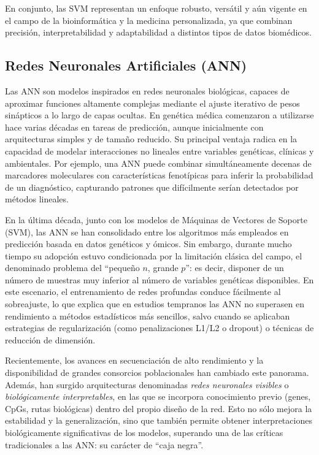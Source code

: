 \documentclass[11pt,a4paper,spanish]{book}
\numberwithin{equation}{chapter}
\numberwithin{figure}{chapter}
\begin{document}
En conjunto, las SVM representan un enfoque robusto, versátil y aún vigente en el campo de la bioinformática y la medicina personalizada, ya que combinan precisión, interpretabilidad y adaptabilidad a distintos tipos de datos biomédicos.
\cite{info15040235}

\subsection{Redes Neuronales Artificiales (ANN)}

Las ANN son modelos inspirados en redes neuronales biológicas, capaces de aproximar funciones altamente complejas mediante el ajuste iterativo de pesos sinápticos a lo largo de capas ocultas. En genética médica comenzaron a utilizarse hace varias décadas en tareas de predicción, aunque inicialmente con arquitecturas simples y de tamaño reducido\cite{lisboa2002,Libbrecht2015}. Su principal ventaja radica en la capacidad de modelar interacciones no lineales entre variables genéticas, clínicas y ambientales. Por ejemplo, una ANN puede combinar simultáneamente decenas de marcadores moleculares con características fenotípicas para inferir la probabilidad de un diagnóstico, capturando patrones que difícilmente serían detectados por métodos lineales.\cite{deep_angemuller_2016,rajkomar_2019}

En la última década, junto con los modelos de Máquinas de Vectores de Soporte (SVM), las ANN se han consolidado entre los algoritmos más empleados en predicción basada en datos genéticos y ómicos\cite{Libbrecht2015,deep_angemuller_2016}. Sin embargo, durante mucho tiempo su adopción estuvo condicionada por la limitación clásica del campo, el denominado problema del “pequeño $n$, grande $p$”: es decir, disponer de un número de muestras muy inferior al número de variables genéticas disponibles. En este escenario, el entrenamiento de redes profundas conduce fácilmente al sobreajuste, lo que explica que en estudios tempranos las ANN no superasen en rendimiento a métodos estadísticos más sencillos, salvo cuando se aplicaban estrategias de regularización (como penalizaciones L1/L2 o dropout) o técnicas de reducción de dimensión\cite{LeCun_2015}.

Recientemente, los avances en secuenciación de alto rendimiento y la disponibilidad de grandes consorcios poblacionales han cambiado este panorama. Además, han surgido arquitecturas denominadas \textit{redes neuronales visibles} o \textit{biológicamente interpretables}, en las que se incorpora conocimiento previo (genes, CpGs, rutas biológicas) dentro del propio diseño de la red. Esto no sólo mejora la estabilidad y la generalización, sino que también permite obtener interpretaciones biológicamente significativas de los modelos, superando una de las críticas tradicionales a las ANN: su carácter de “caja negra”\cite{vanHilten2024,deep_angemuller_2016}.
\end{document}
